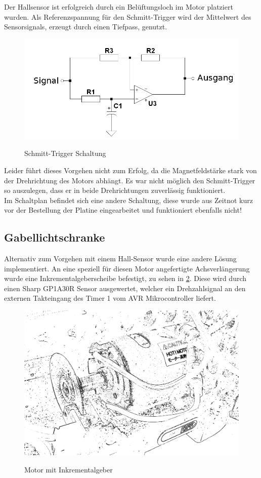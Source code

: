 Der Hallsensor ist erfolgreich durch ein Belüftungsloch im Motor platziert wurden. Als Referenzspannung für den Schmitt-Trigger wird der
Mittelwert des Sensorsignals, erzeugt durch einen Tiefpass, genutzt.

\begin{figure}[H]
\centering
\includegraphics[width=.5\textwidth]{schmitt.png}\\
\caption{Schmitt-Trigger Schaltung}%
\label{fig:schmitt}
\end{figure}

Leider führt dieses Vorgehen nicht zum Erfolg, da die Magnetfeldstärke stark von der Drehrichtung des Motors abhängt. Es war nicht möglich
den Schmitt-Trigger so auszulegen, dass er in beide Drehrichtungen zuverlässig funktioniert.\\

Im Schaltplan befindet sich eine andere Schaltung, diese wurde aus Zeitnot kurz vor der Bestellung der Platine eingearbeitet und funktioniert ebenfalls nicht!

\subsection{Gabellichtschranke}

Alternativ zum Vorgehen mit einem Hall-Sensor wurde eine andere Lö\-sung implementiert. An eine speziell für diesen Motor angefertigte Achsverlängerung wurde eine Inkrementalgeberscheibe befestigt, zu sehen in \cref{fig:gabellichtschranke}. 
Diese wird durch einen Sharp GP1A30R Sensor ausgewertet, welcher ein Drehzahlsignal an den externen Takteingang des Timer 1 vom AVR Mikrocontroller liefert.
\begin{figure}[H]
\centering
\includegraphics[width=.8\textwidth]{odometrie.png}\\
\caption{Motor mit Inkrementalgeber}%
\label{fig:gabellichtschranke}
\end{figure}

